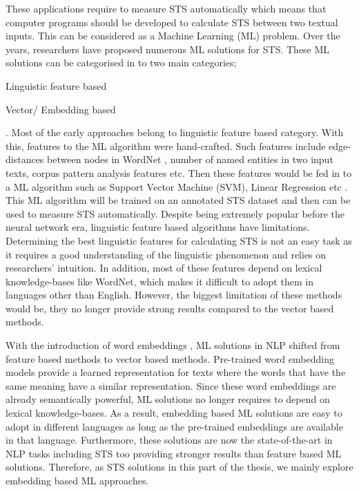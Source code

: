  These applications require to measure STS automatically which means that computer programs should be developed to calculate STS between two textual inputs. This can be considered as a Machine Learning (ML) problem. Over the years, researchers have proposed numerous ML solutions for STS. These ML solutions can be categorised in to two main categories;  
 \begin{enumerate*}[label=(\alph*)]
 	\item Linguistic feature based
 	\item Vector/ Embedding based
 \end{enumerate*}
. Most of the early approaches belong to linguistic feature based category. With this, features to the ML algorithm were hand-crafted. Such features include edge-distances between nodes in WordNet \cite{10.1145/219717.219748}, number of named entities in two input texts, corpus pattern analysis features etc. Then these features would be fed in to a ML algorithm such as Support Vector Machine (SVM), Linear Regression etc \cite{bechara-etal-2015-miniexperts}. This ML algorithm will be trained on an annotated STS dataset and then can be used to measure STS automatically. Despite being extremely popular before the neural network era, linguistic feature based algorithms have limitations. Determining the best linguistic features for calculating STS is not an easy task as it requires a good understanding of the linguistic phenomenon and relies on researchers' intuition. In addition, most of these features depend on lexical knowledge-bases like WordNet, which makes it difficult to adopt them in languages other than English. However, the biggest limitation of these methods would be, they no longer provide strong results compared to the vector based methods. 

With the introduction of word embeddings \cite{DBLP:journals/corr/abs-1301-3781}, ML solutions in NLP shifted from feature based methods to vector based methods. Pre-trained word embedding models provide a learned representation for texts where the words that have the same meaning have a similar representation. Since these word embeddings are already semantically powerful, ML solutions no longer requires to depend on lexical knowledge-bases. As a result, embedding based ML solutions are easy to adopt in different languages as long as the pre-trained embeddings are available in that language. Furthermore, these solutions are now the state-of-the-art in NLP tasks including STS too providing stronger results than feature based ML solutions. Therefore, as STS solutions in this part of the thesis,  we mainly explore embedding based ML approaches.

